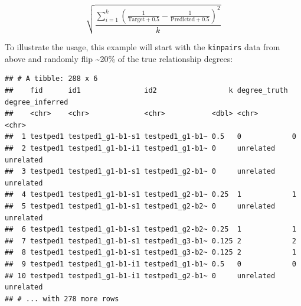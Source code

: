 \documentclass[9pt,a4paper,]{extarticle}
\newenvironment{Shaded}{\begin{snugshade}}{\end{snugshade}}
\newcommand{\CommentTok}[1]{\textcolor[rgb]{0.56,0.35,0.01}{\textit{#1}}}
\newcommand{\ControlFlowTok}[1]{\textcolor[rgb]{0.13,0.29,0.53}{\textbf{#1}}}
\newcommand{\DataTypeTok}[1]{\textcolor[rgb]{0.13,0.29,0.53}{#1}}
\newcommand{\DecValTok}[1]{\textcolor[rgb]{0.00,0.00,0.81}{#1}}
\newcommand{\KeywordTok}[1]{\textcolor[rgb]{0.13,0.29,0.53}{\textbf{#1}}}
\newcommand{\NormalTok}[1]{#1}
\newcommand{\OperatorTok}[1]{\textcolor[rgb]{0.81,0.36,0.00}{\textbf{#1}}}
\newcommand{\StringTok}[1]{\textcolor[rgb]{0.31,0.60,0.02}{#1}}
\begin{document}
\begin{equation}
\sqrt{\frac{\sum_{i=1}^{k}(\frac{1}{\text{Target}+0.5}-\frac{1}{\text{Predicted}+0.5})^2}{k}}
\end{equation}

To illustrate the usage, this example will start with the \texttt{kinpairs} data from above and randomly flip \textasciitilde20\% of the true relationship degrees:

\begin{Shaded}
\end{Shaded}

\begin{verbatim}
## # A tibble: 288 x 6
##    fid      id1               id2                 k degree_truth degree_inferred
##    <chr>    <chr>             <chr>           <dbl> <chr>        <chr>          
##  1 testped1 testped1_g1-b1-s1 testped1_g1-b1~ 0.5   0            0              
##  2 testped1 testped1_g1-b1-i1 testped1_g1-b1~ 0     unrelated    unrelated      
##  3 testped1 testped1_g1-b1-s1 testped1_g2-b1~ 0     unrelated    unrelated      
##  4 testped1 testped1_g1-b1-s1 testped1_g2-b1~ 0.25  1            1              
##  5 testped1 testped1_g1-b1-s1 testped1_g2-b2~ 0     unrelated    unrelated      
##  6 testped1 testped1_g1-b1-s1 testped1_g2-b2~ 0.25  1            1              
##  7 testped1 testped1_g1-b1-s1 testped1_g3-b1~ 0.125 2            2              
##  8 testped1 testped1_g1-b1-s1 testped1_g3-b2~ 0.125 2            1              
##  9 testped1 testped1_g1-b1-i1 testped1_g1-b1~ 0.5   0            0              
## 10 testped1 testped1_g1-b1-i1 testped1_g2-b1~ 0     unrelated    unrelated      
## # ... with 278 more rows
\end{verbatim}
\end{document}
